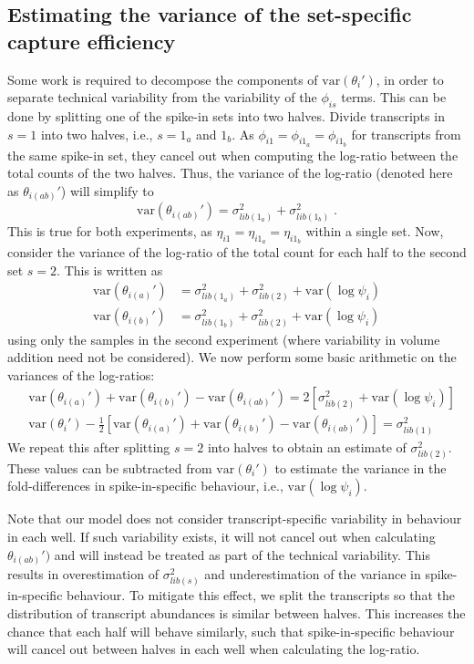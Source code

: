 \documentclass{article}
\begin{document}
\subsection{Estimating the variance of the set-specific capture efficiency}
Some work is required to decompose the components of $\mbox{var}(\theta_i')$, in order to separate technical variability from the variability of the $\phi_{is}$ terms.
This can be done by splitting one of the spike-in sets into two halves.
Divide transcripts in $s=1$ into two halves, i.e., $s=1_a$ and $1_b$.
As $\phi_{i1} = \phi_{i1_a} = \phi_{i1_b}$ for transcripts from the same spike-in set, they cancel out when computing the log-ratio between the total counts of the two halves.
Thus, the variance of the log-ratio (denoted here as $\theta_{i(ab)}'$) will simplify to 
\[
    \mbox{var}(\theta_{i(ab)}') = \sigma^2_{lib(1_a)} + \sigma^2_{lib(1_b)} \;.
\]
This is true for both experiments, as $\eta_{i1} = \eta_{i1_a} = \eta_{i1_b}$ within a single set.
Now, consider the variance of the log-ratio of the total count for each half to the second set $s=2$.
This is written as
\begin{align*}
    \mbox{var}(\theta_{i(a)}') &= \sigma^2_{lib(1_a)} + \sigma^2_{lib(2)} + \mbox{var}(\log \psi_i) \\
    \mbox{var}(\theta_{i(b)}') &= \sigma^2_{lib(1_b)} + \sigma^2_{lib(2)} + \mbox{var}(\log \psi_i)
\end{align*}
using only the samples in the second experiment (where variability in volume addition need not be considered).
We now perform some basic arithmetic on the variances of the log-ratios:
\begin{align*}
    &\mbox{var}(\theta_{i(a)}') +  \mbox{var}(\theta_{i(b)}') - \mbox{var}(\theta_{i(ab)}') = 2 [\sigma^2_{lib(2)} + \mbox{var}(\log \psi_i)] \\
    &\mbox{var}(\theta_i') - \textstyle\frac{1}{2}[\mbox{var}(\theta_{i(a)}') + \mbox{var}(\theta_{i(b)}') - \mbox{var}(\theta_{i(ab)}') ] = \sigma^2_{lib(1)}
\end{align*}
We repeat this after splitting $s=2$ into halves to obtain an estimate of $\sigma^2_{lib(2)}$.
These values can be subtracted from $\mbox{var}(\theta_i')$ to estimate the variance in the fold-differences in spike-in-specific behaviour, i.e., $\mbox{var}(\log \psi_i)$.

Note that our model does not consider transcript-specific variability in behaviour in each well.
If such variability exists, it will not cancel out when calculating $\theta_{i(ab)}')$ and will instead be treated as part of the technical variability.
This results in overestimation of $\sigma^2_{lib(s)}$ and underestimation of the variance in spike-in-specific behaviour.
To mitigate this effect, we split the transcripts so that the distribution of transcript abundances is similar between halves.
This increases the chance that each half will behave similarly, such that spike-in-specific behaviour will cancel out between halves in each well when calculating the log-ratio.
\end{document}

